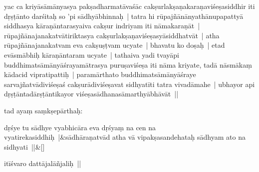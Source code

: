 \documentclass[article,12pt,a4paper]{memoir}%
\newcounter{parCount}
\begin{document}
	  
	

	  \pstart \leavevmode%
	\label{thakur75-50.7}yac ca kriyāsāmānyasya pakṣadharmatāvaśāc cakṣurlakṣaṇakaraṇaviśeṣasiddhir iti dṛṣṭānto darśitaḥ so 'pi sādhyābhinnaḥ | tatra hi rūpajñānānyathānupapattyā siddhasya kāraṇāntarasyaiva cakṣur indriyam iti nāmakaraṇāt | rūpajñānajanakatvātiriktasya cakṣurlakṣaṇaviśeṣasyāsiddhatvāt | atha rūpajñānajanakatvam eva cakṣuṣṭvam ucyate | bhavatu ko doṣaḥ | etad evāsmābhiḥ kāraṇāntaram ucyate | tathaiva yadi tvayāpi buddhimatsāmānyāśrayamātrasya puruṣaviśeṣa iti nāma kriyate, tadā nāsmākaṃ kādacid vipratipattiḥ | paramārthato buddhimatsāmānyāśraye sarvajñatvādiviśeṣaś cakṣurādiviśeṣavat sidhyatīti tatra vivadāmahe | ubhayor api dṛṣṭāntadārṣṭāntikayor viśeṣasādhanasāmarthyābhāvāt ||
	{}
	\pend%
      
	  
	

	  \pstart \leavevmode%
	\label{thakur75-50.15}tad ayaṃ saṃkṣepārthaḥ:
	{}
	\pend%
      
	    
	    \stanza[\smallbreak]
	  dṛśye tu sādhye vyabhicāra eva dṛśyaṃ na cen na \label{ratnakīrtinibandhāvali__36r1PF7IMV4JB3OIRJAO5COAIMX}vyatireka\label{ratnakīrtinibandhāvali__36r1PF7IMV3NGIPUSUJNFVNEHT1}siddhiḥ |&sādhāraṇatvād atha vā vipakṣasandehataḥ sādhyam ato na sidhyati ||\&[\smallbreak]
	  
	  
	  

	  \pstart \leavevmode%
	itīśvaro dattājalāñjaliḥ ||
	{}
	\pend%
      \label{īsd-sādhanasvarūpa}
	  
	
\end{document}
